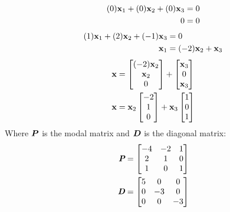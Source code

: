 \documentclass{article}
\begin{document}
\begin{align*}
	(0)\vect{x}_1 + (0)\vect{x}_2 + (0)\vect{x}_3 & = 0 \\
	0 & = 0
\end{align*}
\begin{align*}
	(1)\vect{x}_1 + (2)\vect{x}_2 + (-1)\vect{x}_3 & = 0 \\
	\vect{x}_1 & = (-2)\vect{x}_2 + \vect{x}_3
\end{align*}
\begin{align*}
	\vect{x} & =
		\begin{bmatrix} (-2)\vect{x}_2 \\ \vect{x}_2 \\ 0 \end{bmatrix}
		+ \begin{bmatrix} \vect{x}_3 \\ 0 \\ \vect{x}_3 \end{bmatrix} \\
	\vect{x} & =
		\vect{x}_2 \begin{bmatrix} -2 \\ 1 \\ 0 \end{bmatrix}
		+ \vect{x}_3 \begin{bmatrix} 1 \\ 0 \\ 1 \end{bmatrix}
\end{align*}
Where $ \matr{P} $ is the modal matrix and $ \matr{D} $ is the diagonal matrix:
\begin{align*}
	\matr{P} & =
		\begin{bmatrix}
			-4 & -2 & 1 \\
			2 & 1 & 0 \\
			1 & 0 & 1
		\end{bmatrix} \\
	\matr{D} & =
		\begin{bmatrix}
			5 & 0 & 0 \\
			0 & -3 & 0 \\
			0 & 0 & -3 \\
		\end{bmatrix}
\end{align*}
\end{document}
